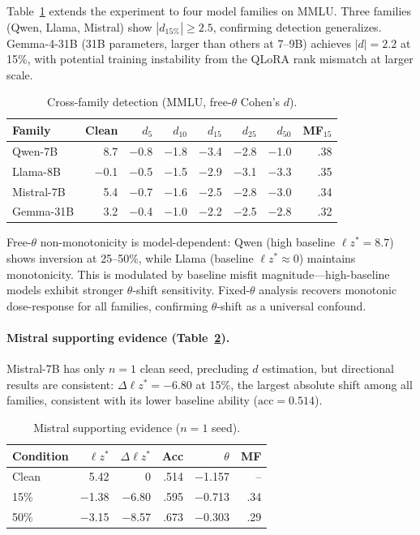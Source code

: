 \documentclass[11pt,twocolumn]{article}
\newcommand{\lzs}{\ensuremath{\ell z^*}}
\begin{document}
Table~\ref{tab:cross_family} extends the experiment to four model families on MMLU. Three families (Qwen, Llama, Mistral) show $|d_{15\%}| \geq 2.5$, confirming detection generalizes. Gemma-4-31B (31B parameters, larger than others at 7--9B) achieves $|d| = 2.2$ at 15\%, with potential training instability from the QLoRA rank mismatch at larger scale.

\begin{table}[t]
\centering
\caption{Cross-family detection (MMLU, free-$\theta$ Cohen's $d$).}
\label{tab:cross_family}
\footnotesize
\begin{tabular}{lrrrrrrr}
\toprule
Family & Clean & $d_5$ & $d_{10}$ & $d_{15}$ & $d_{25}$ & $d_{50}$ & MF$_{15}$ \\
\midrule
Qwen-7B & 8.7 & $-$0.8 & $-$1.8 & $-$3.4 & $-$2.8 & $-$1.0 & .38 \\
Llama-8B & $-$0.1 & $-$0.5 & $-$1.5 & $-$2.9 & $-$3.1 & $-$3.3 & .35 \\
Mistral-7B & 5.4 & $-$0.7 & $-$1.6 & $-$2.5 & $-$2.8 & $-$3.0 & .34 \\
Gemma-31B & 3.2 & $-$0.4 & $-$1.0 & $-$2.2 & $-$2.5 & $-$2.8 & .32 \\
\bottomrule
\end{tabular}
\vspace{-0.3cm}
\end{table}

Free-$\theta$ non-monotonicity is model-dependent: Qwen (high baseline $\lzs = 8.7$) shows inversion at 25--50\%, while Llama (baseline $\lzs \approx 0$) maintains monotonicity. This is modulated by baseline misfit magnitude---high-baseline models exhibit stronger $\theta$-shift sensitivity. Fixed-$\theta$ analysis recovers monotonic dose-response for all families, confirming $\theta$-shift as a universal confound.

\paragraph{Mistral supporting evidence (Table~\ref{tab:mistral}).} Mistral-7B has only $n=1$ clean seed, precluding $d$ estimation, but directional results are consistent: $\Delta\lzs = -6.80$ at 15\%, the largest absolute shift among all families, consistent with its lower baseline ability ($\text{acc} = 0.514$).

\begin{table}[t]
\centering
\caption{Mistral supporting evidence ($n=1$ seed).}
\label{tab:mistral}
\footnotesize
\begin{tabular}{lrrrrr}
\toprule
Condition & $\lzs$ & $\Delta\lzs$ & Acc & $\theta$ & MF \\
\midrule
Clean & 5.42 & 0 & .514 & $-$1.157 & -- \\
15\% & $-$1.38 & $-$6.80 & .595 & $-$0.713 & .34 \\
50\% & $-$3.15 & $-$8.57 & .673 & $-$0.303 & .29 \\
\bottomrule
\end{tabular}
\vspace{-0.3cm}
\end{table}
\end{document}
